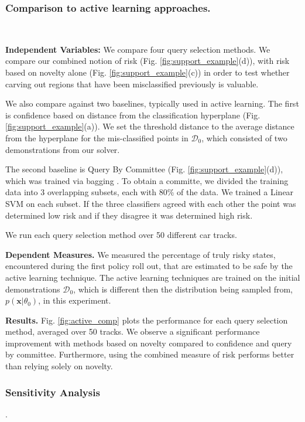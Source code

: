 \documentclass[10pt, conference]{ieeeconf}      %
\newcommand{\bx}{\mathbf{x}}
\begin{document}
\subsubsection{Comparison to active learning approaches.}\

\noindent\textbf{Independent Variables:} We compare four query selection methods. We compare our combined notion of risk (Fig. \ref{fig:support_example}(d)), with risk based on novelty alone (Fig. \ref{fig:support_example}(c)) in order to test whether carving out regions that have been misclassified previously is valuable. 

We also compare against two baselines, typically used in active learning. The first is confidence based on distance from the classification hyperplane \cite{tong2002support} (Fig. \ref{fig:support_example}(a)). We set the threshold distance to the average distance from the hyperplane for the mis-classified points in $\mathcal{D}_0$, which consisted of two demonstrations from our solver. 

The second baseline is Query By Committee (Fig. \ref{fig:support_example}(d)), which was trained via bagging \cite{breiman1996bagging}.  To obtain a committe, we divided the training data into 3 overlapping subsets, each with 80\% of the data. We trained a Linear SVM on each subset. If the three classifiers agreed with each other the point was determined low risk and if they disagree it was determined high risk. 

We run each query selection method over 50 different car tracks.

\noindent\textbf{Dependent Measures. }We measured the percentage of truly risky states, encountered during the first policy roll out, that  are estimated to be safe by the active learning technique. The active learning techniques are trained on the initial demonstrations $\mathcal{D}_0$, which is different then the distribution being sampled from, $p(\bx|\theta_0)$, in this experiment.

\noindent\textbf{Results. } Fig. \ref{fig:active_comp}  plots the performance for each query selection method, averaged over 50 tracks. We observe a significant performance improvement with methods based on novelty compared to confidence and query by committee. Furthermore, using the combined measure of risk performs better than relying solely on novelty. 

\subsubsection{Sensitivity Analysis}. 
\end{document}

